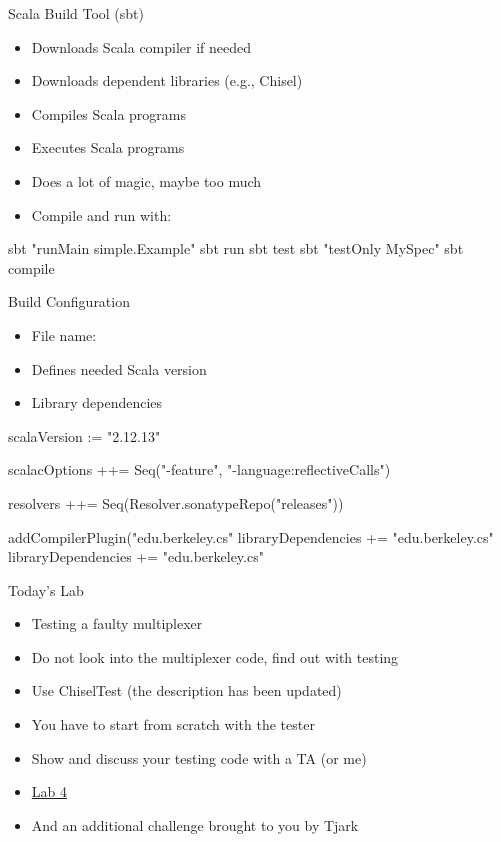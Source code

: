 \begin{frame}[fragile]{Scala Build Tool (sbt)}
\begin{itemize}
\item Downloads Scala compiler if needed
\item Downloads dependent libraries (e.g., Chisel)
\item Compiles Scala programs
\item Executes Scala programs
\item Does a lot of magic, maybe too much
\item Compile and run with:
\end{itemize}
\begin{chisel}
sbt "runMain simple.Example"
sbt run
sbt test
sbt "testOnly MySpec"
sbt compile
\end{chisel}
\end{frame}

\begin{frame}[fragile]{Build Configuration}
\begin{itemize}
\item File name: 
\item Defines needed Scala version
\item Library dependencies
\end{itemize}
\begin{chisel}
scalaVersion := "2.12.13"

scalacOptions ++= Seq("-feature", "-language:reflectiveCalls")

resolvers ++= Seq(Resolver.sonatypeRepo("releases"))

addCompilerPlugin("edu.berkeley.cs" %
libraryDependencies += "edu.berkeley.cs" %
libraryDependencies += "edu.berkeley.cs" %
\end{chisel}
\end{frame}

\begin{frame}[fragile]{Today's Lab}
\begin{itemize}
\item Testing a faulty multiplexer
\item Do not look into the multiplexer code, find out with testing
\item Use ChiselTest (the description has been updated)
\item You have to start from scratch with the tester
\item Show and discuss your testing code with a TA (or me)
\item \href{https://github.com/schoeberl/chisel-lab/tree/master/lab4}{Lab 4}
\item And an additional challenge brought to you by Tjark
\end{itemize}
\end{frame}

